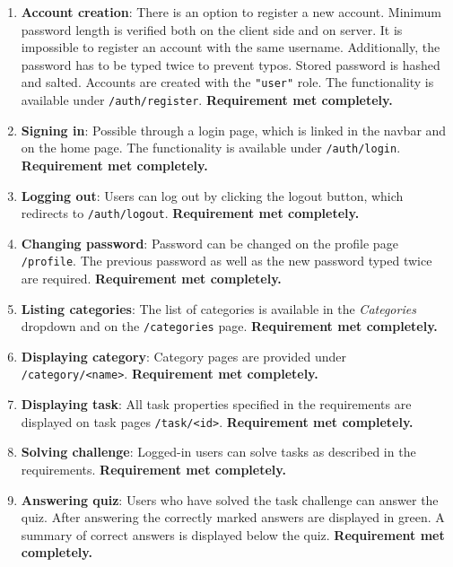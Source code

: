 \begin{enumerate}
	\item \textbf{Account creation}: There is an option to register a new account. Minimum password length is verified both on the client side and on server. It is impossible to register an account with the same username. Additionally, the password has to be typed twice to prevent typos. Stored password is hashed and salted. Accounts are created with the \texttt{"user"} role. The functionality is available under \texttt{/auth/register}. \textbf{Requirement met completely.}

	\item \textbf{Signing in}: Possible through a login page, which is linked in the navbar and on the home page. The functionality is available under \texttt{/auth/login}. \textbf{Requirement met completely.}

	\item \textbf{Logging out}: Users can log out by clicking the logout button, which redirects to \texttt{/auth/logout}. \textbf{Requirement met completely.}

	\item \textbf{Changing password}: Password can be changed on the profile page \texttt{/profile}. The previous password as well as the new password typed twice are required. \textbf{Requirement met completely.}

	\item \textbf{Listing categories}: The list of categories is available in the \textit{Categories} dropdown and on the \texttt{/categories} page. \textbf{Requirement met completely.}

	\item \textbf{Displaying category}: Category pages are provided under \texttt{/category/<name>}. \textbf{Requirement met completely.}

	\item \textbf{Displaying task}: All task properties specified in the requirements are displayed on task pages \texttt{/task/<id>}. \textbf{Requirement met completely.}

	\item \textbf{Solving challenge}: Logged-in users can solve tasks as described in the requirements. \textbf{Requirement met completely.}

	\item \textbf{Answering quiz}: Users who have solved the task challenge can answer the quiz. After answering the correctly marked answers are displayed in green. A summary of correct answers is displayed below the quiz. \textbf{Requirement met completely.}


\end{enumerate}
